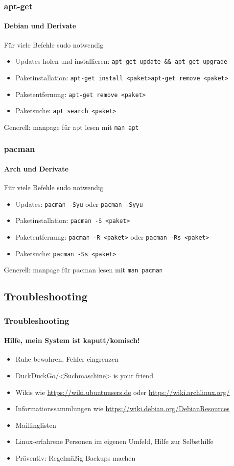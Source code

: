 \documentclass[9pt]{beamer}
\begin{document}
\begin{frame}
 \frametitle{apt-get}
 \framesubtitle{Debian und Derivate}
 \begin{Large}
 Für viele Befehle sudo notwendig
 \begin{itemize}
  \item Updates holen und installieren: \texttt{apt-get update \&\& apt-get upgrade}
  \item Paketinstallation: \texttt{apt-get install <paket>}\texttt{apt-get remove <paket>}
  \item Paketentfernung: \texttt{apt-get remove <paket>}
  \item Paketsuche:  \texttt{apt search <paket>}
 \end{itemize}
 Generell: manpage für apt lesen mit \texttt{man apt}
 \end{Large}

\end{frame}

\begin{frame}
 \frametitle{pacman}
 \framesubtitle{Arch und Derivate}
 \begin{Large}
  Für viele Befehle sudo notwendig
 \begin{itemize}
  \item Updates: \texttt{pacman -Syu} oder \texttt{pacman -Syyu}
  \item Paketinstallation: \texttt{pacman -S <paket>}
  \item Paketentfernung: \texttt{pacman -R <paket>} oder \texttt{pacman -Rs <paket>}
  \item Paketsuche: \texttt{pacman -Ss <paket>}
 \end{itemize}
 Generell: manpage für pacman lesen mit \texttt{man pacman}
 \end{Large}
\end{frame}

\subsection{Troubleshooting}
\begin{frame}
 \frametitle{Troubleshooting}
 \framesubtitle{Hilfe, mein System ist kaputt/komisch!}
 \begin{Large}
 \begin{itemize}
  \item Ruhe bewahren, Fehler eingrenzen
  \item DuckDuckGo/<Suchmaschine> is your friend
  \item Wikis wie \href{https://wiki.ubuntuusers.de}{https://wiki.ubuntuusers.de} oder \href{https://wiki.archlinux.org/}{https://wiki.archlinux.org/} 
  \item Informationssammlungen wie \href{https://wiki.debian.org/DebianResources}{https://wiki.debian.org/DebianResources}
  \item Maillinglisten
  \item Linux-erfahrene Personen im eigenen Umfeld, Hilfe zur Selbsthilfe
  \item Präventiv: Regelmäßig Backups machen
 \end{itemize}
 \end{Large}
\end{frame}
\end{document}
